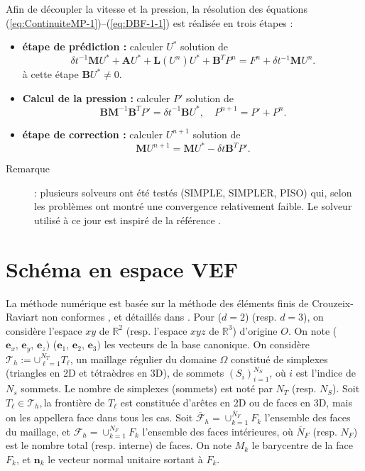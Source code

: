 Afin de d\'ecoupler la vitesse et la pression, la r\'esolution des \'equations
(\ref{eq:ContinuiteMP-1})--(\ref{eq:DBF-1-1}) est r\'ealis\'ee en trois
\'etapes \cite{Chor68,Tema68}: 
\begin{itemize}
\item \textbf{\'etape de pr\'ediction :} calculer $U^{*}$ solution de 
\[
{\delta t}^{-1}\mathbf{M}U^{*}+\mathbf{A}U^{*}+\mathbf{L}(U^{n})U^{*}+\mathbf{B}^{T}P^{n}=F^{n}+\delta t^{-1}\mathbf{M}U^{n}.
\]
\`a cette \'etape $\mathbf{B}U^{*}\neq0$. 
\item \textbf{Calcul de la pression :} calculer $P'$ solution de 
\[
\mathbf{B}\mathbf{M}^{-1}\mathbf{B}^{T}P'={\delta t}^{-1}\mathbf{B}U^{*},\quad P^{n+1}=P'+P^{n}.
\]

\item \textbf{\'etape de correction :} calculer $U^{n+1}$ solution de 
\[
\mathbf{M}U^{n+1}=\mathbf{M}U^{*}-{\delta t}\mathbf{B}^{T}P'.
\]
\end{itemize}
\begin{description}
\item [{Remarque}] : plusieurs solveurs ont \'et\'e test\'es (SIMPLE, SIMPLER,
PISO) qui, selon les probl\`emes ont montr\'e une convergence relativement
faible. Le solveur utilis\'e \`a ce jour est inspir\'e de la r\'ef\'erence \cite{Guermond-Quartapelle_IJNMF1998}.
\end{description}

\section{Sch\'ema en espace VEF }

La m\'ethode num\'erique est bas\'ee sur la m\'ethode des \'el\'ements finis de
Crouzeix-Raviart non conformes \cite{CrRa73}, et d\'etaill\'es dans \cite{Emon92,Heib03,Fort06,Angeli_etal_FVCA2017}.
Pour ($d=2$) (resp. $d=3$), on consid\`ere l'espace $xy$ de $\mathbb{R}^{2}$
(resp. l'espace $xyz$ de $\mathbb{R}^{3}$) d'origine $O$. On note
($\mathbf{e}_{x},\,\mathbf{e}_{y},\,\mathbf{e}_{z})$ ($\mathbf{e}_{1},\,\mathbf{e}_{2},\,\mathbf{e}_{3})$
les vecteurs de la base canonique. On consid\`ere $\mathcal{T}_{h}:={\displaystyle \cup}{}_{\ell=1}^{N_{T}}T_{\ell}$,
un maillage r\'egulier du domaine $\Omega$ constitu\'e de simplexes (triangles
en 2D et t\'etra\`edres en 3D), de sommets $(S_{i})_{i=1}^{N_{S}}$, o\`u
$i$ est l'indice de $N_{s}$ sommets. Le nombre de simplexes (sommets)
est not\'e par $N_{T}$ (resp. $N_{S}$). Soit $T_{\ell}\in\mathcal{T}_{h},$la
fronti\`ere de $T_{\ell}$ est constitu\'ee d'ar\^etes en 2D ou de faces
en 3D, mais on les appellera \og face \fg{} dans tous les cas. Soit
$\overline{\mathcal{F}}_{h}=\cup_{k=1}^{\overline{N}_{F}}F_{k}$ l'ensemble
des faces du maillage, et $\mathcal{F}_{h}=\cup_{k=1}^{N_{F}}F_{k}$
l'ensemble des faces int\'erieures, o\`u $\overline{N}_{F}$ (resp. $N_{F}$)
est le nombre total (resp. interne) de faces. On note $M_{k}$ le
barycentre de la face $F_{k}$, et $\mathbf{n}_{k}$ le vecteur normal
unitaire sortant \`a $F_{k}$.

